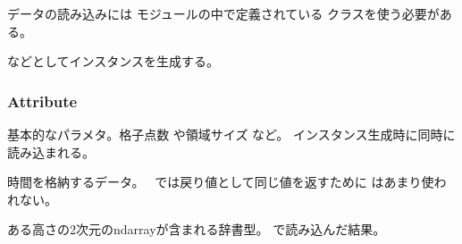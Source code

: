 \documentclass[letterpaper,10pt,dvipdfmx,report]{sphinxmanual}
\begin{document}
データの読み込みには  モジュールの中で定義されている  クラスを使う必要がある。

\begin{sphinxVerbatim}[commandchars=\\\{\}]
 
  
  
\end{sphinxVerbatim}

などとしてインスタンスを生成する。


\subsubsection{Attribute}
\label{\detokenize{io:attribute}}

\begin{fulllineitems}
\label{\detokenize{io:R2D2.R2D2_data.p}}
基本的なパラメタ。格子点数  や領域サイズ  など。
インスタンス生成時に同時に読み込まれる。

\end{fulllineitems}


\begin{fulllineitems}
\label{\detokenize{io:R2D2.R2D2_data.t}}
時間を格納するデータ。　{\hyperref[\detokenize{io:R2D2.R2D2_data.read_time}]{}} では戻り値として同じ値を返すために  はあまり使われない。

\end{fulllineitems}


\begin{fulllineitems}
\label{\detokenize{io:R2D2.R2D2_data.qs}}
ある高さの2次元のndarrayが含まれる辞書型。 {\hyperref[\detokenize{io:R2D2.R2D2_data.read_qq_select}]{}} で読み込んだ結果。

\end{fulllineitems}
\end{document}
